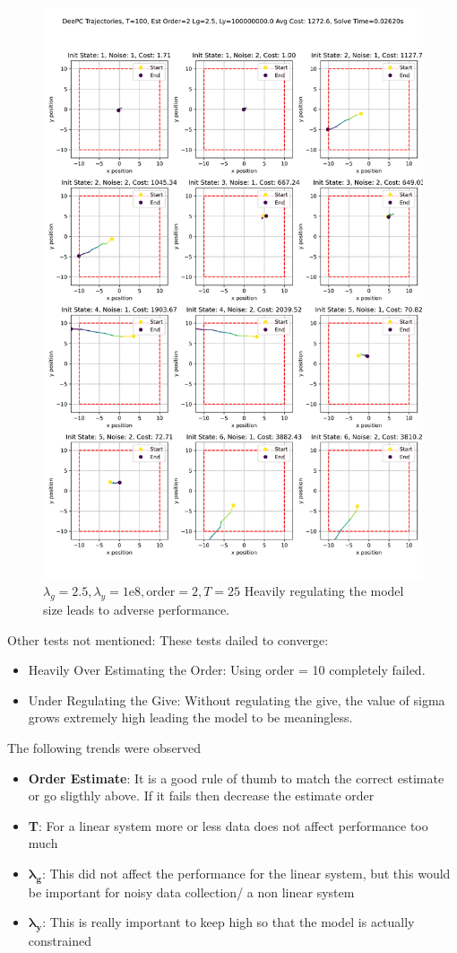 \documentclass[11pt,a4paper]{article}
\begin{document}
\begin{figure}
    \centering
    \includegraphics[width=0.85\linewidth]{./figures/DeePC_trajectories_100_2_2.5_100000000.0.png}
    \caption{$\lambda_g=2.5, \lambda_y=1\mathrm{e}8, \text{order}=2, T=25$ Heavily regulating the model size leads to adverse performance.}
    \label{fig:enter-label}
\end{figure}


Other tests not mentioned:
These tests dailed to converge:
\begin{itemize}
    \item Heavily Over Estimating the Order: Using order = 10 completely failed.
    \item Under Regulating the Give: Without regulating the give, the value of sigma grows extremely high leading the model to be meaningless.
\end{itemize}




The following trends were observed
\begin{itemize}
    \item \textbf{Order Estimate}: It is a good rule of thumb to match the correct estimate or go sligthly above. If it fails then decrease the estimate order
    \item \textbf{T}: For a linear system more or less data does not affect performance too much
    \item \( \mathbf{\lambda_g} \): This did not affect the performance for the linear system, but this would be important for noisy data collection/ a non linear system
    \item \( \mathbf{\lambda_y} \): This is really important to keep high so that the model is actually constrained
\end{itemize}
\end{document}
